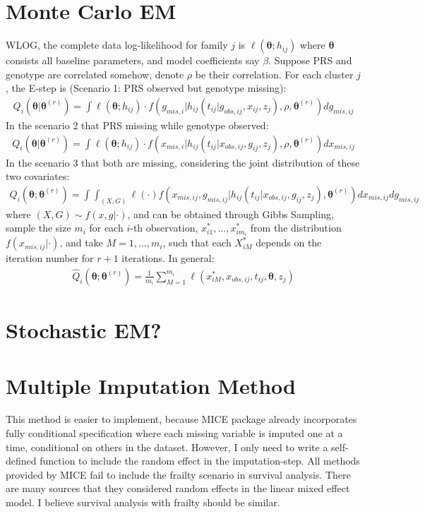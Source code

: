 \documentclass[preprint,12pt]{elsarticle}
\begin{document}
\section{Monte Carlo EM}
WLOG, the complete data log-likelihood for family $j$ is $\ell(\boldsymbol{\theta}; h_{ij})$
where $\boldsymbol{\theta}$ consists all baseline parameters, and model coefficients say $\beta$. Suppose PRS and genotype are correlated somehow, denote $\rho$ be their correlation. For each cluster $j$, the E-step is (Scenario 1: PRS observed but genotype missing):
\begin{align}
    Q_i(\boldsymbol{\theta}|\boldsymbol{\theta}^{(r)})=\int \ell(\boldsymbol{\theta};h_{ij})\cdot f(g_{mis,i}|h_{ij}(t_{ij}|g_{obs,ij}, x_{ij},z_j), \rho, \boldsymbol{\theta}^{(r)})dg_{mis,ij}
\end{align}
In the scenario 2 that PRS missing while genotype observed: 
\begin{align} 
    Q_i(\boldsymbol{\theta}|\boldsymbol{\theta}^{(r)})=\int \ell(\boldsymbol{\theta};h_{ij})\cdot f(x_{mis,i}|h_{ij}(t_{ij}|x_{obs,ij}, g_{ij},z_j), \rho, \boldsymbol{\theta}^{(r)})dx_{mis,ij}
\end{align}
In the scenario 3 that both are missing, considering the joint distribution of these two covariates:
\begin{align}
    Q_i(\boldsymbol{\theta};\boldsymbol{\theta}^{(r)})=\int\int_{(X,G)}\ell(\cdot) f(x_{mis,ij},g_{mis,ij}|h_{ij}(t_{ij}|x_{obs,ij}, g_{ij},z_j), \boldsymbol{\theta}^{(r)})dx_{mis,ij}dg_{mis,ij}
\end{align}
where $(X, G)\sim f(x,g|\cdot)$, and can be obtained through Gibbs Sampling, sample the size $m_i$ for each $i$-th observation, $x_{i1}^*,...,x_{im_i}^*$ from the distribution $f(x_{mis,ij}|\cdot)$, and take $M = 1,...,m_i$, such that each $X_{iM}^*$ depends on the iteration number for $r+1$ iterations. In general:
\begin{align}
    \hat{Q}_i(\boldsymbol{\theta}; \boldsymbol{\theta}^{(r)})=\frac{1}{m_i}\sum_{M=1}^{m_i}\ell(x_{iM}^*, x_{obs,ij},t_{ij}, \boldsymbol{\theta},z_j)
\end{align}


\section{Stochastic EM?}

\section{Multiple Imputation Method}
This method is easier to implement, because MICE package already incorporates fully conditional specification where each missing variable is imputed one at a time, conditional on others in the dataset. 
However, I only need to write a self-defined function to include the random effect in the imputation-step. All methods provided by MICE fail to include the frailty scenario in survival analysis. There are many sources that they considered random effects in the linear mixed effect model. I believe survival analysis with frailty should be similar. 
\end{document}
